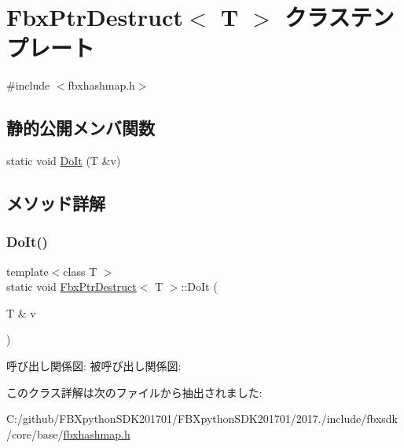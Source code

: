 \hypertarget{class_fbx_ptr_destruct}{}\section{Fbx\+Ptr\+Destruct$<$ T $>$ クラステンプレート}
\label{class_fbx_ptr_destruct}


{\ttfamily \#include $<$fbxhashmap.\+h$>$}

\subsection*{静的公開メンバ関数}
\begin{DoxyCompactItemize}
\item 
static void \hyperlink{class_fbx_ptr_destruct_a32636050fc3eceb289da67817450db7e}{Do\+It} (T \&v)
\end{DoxyCompactItemize}


\subsection{メソッド詳解}
\mbox{\label{class_fbx_ptr_destruct_a32636050fc3eceb289da67817450db7e}} 
\subsubsection{\texorpdfstring{Do\+It()}{DoIt()}}
{\footnotesize\ttfamily template$<$class T $>$ \\
static void \hyperlink{class_fbx_ptr_destruct}{Fbx\+Ptr\+Destruct}$<$ T $>$\+::Do\+It (\begin{DoxyParamCaption}\item[{T \&}]{v }\end{DoxyParamCaption})\hspace{0.3cm}{\ttfamily [static]}}

呼び出し関係図\+:
被呼び出し関係図\+:


このクラス詳解は次のファイルから抽出されました\+:\begin{DoxyCompactItemize}
\item 
C\+:/github/\+F\+B\+Xpython\+S\+D\+K201701/\+F\+B\+Xpython\+S\+D\+K201701/2017./include/fbxsdk/core/base/\hyperlink{fbxhashmap_8h}{fbxhashmap.\+h}\end{DoxyCompactItemize}
